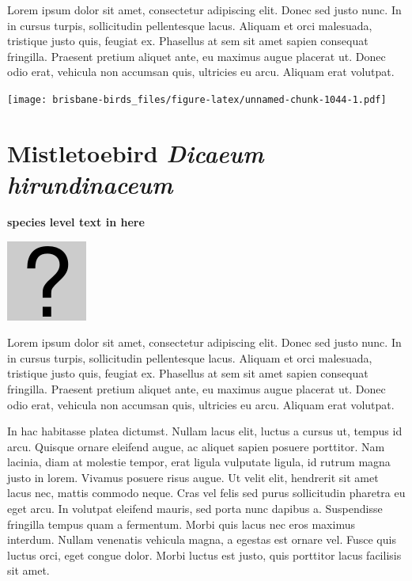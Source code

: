 \documentclass[]{book}
\let\origfigure\figure
\let\endorigfigure\endfigure
\renewenvironment{figure}[1][2] {
  \expandafter\origfigure\expandafter[H]
} {
  \endorigfigure
}
\begin{document}
Lorem ipsum dolor sit amet, consectetur adipiscing elit. Donec sed justo
nunc. In in cursus turpis, sollicitudin pellentesque lacus. Aliquam et
orci malesuada, tristique justo quis, feugiat ex. Phasellus at sem sit
amet sapien consequat fringilla. Praesent pretium aliquet ante, eu
maximus augue placerat ut. Donec odio erat, vehicula non accumsan quis,
ultricies eu arcu. Aliquam erat volutpat.

\texttt{[image: brisbane-birds\_files/figure-latex/unnamed-chunk-1044-1.pdf]}

\section{\texorpdfstring{Mistletoebird \emph{Dicaeum
hirundinaceum}}{Mistletoebird Dicaeum hirundinaceum}}\label{mistletoebird-dicaeum-hirundinaceum}

\textbf{species level text in here}

\begin{figure}
\centering
\includegraphics{assets/missing.png}
\caption{No image for species}
\end{figure}

Lorem ipsum dolor sit amet, consectetur adipiscing elit. Donec sed justo
nunc. In in cursus turpis, sollicitudin pellentesque lacus. Aliquam et
orci malesuada, tristique justo quis, feugiat ex. Phasellus at sem sit
amet sapien consequat fringilla. Praesent pretium aliquet ante, eu
maximus augue placerat ut. Donec odio erat, vehicula non accumsan quis,
ultricies eu arcu. Aliquam erat volutpat.

In hac habitasse platea dictumst. Nullam lacus elit, luctus a cursus ut,
tempus id arcu. Quisque ornare eleifend augue, ac aliquet sapien posuere
porttitor. Nam lacinia, diam at molestie tempor, erat ligula vulputate
ligula, id rutrum magna justo in lorem. Vivamus posuere risus augue. Ut
velit elit, hendrerit sit amet lacus nec, mattis commodo neque. Cras vel
felis sed purus sollicitudin pharetra eu eget arcu. In volutpat eleifend
mauris, sed porta nunc dapibus a. Suspendisse fringilla tempus quam a
fermentum. Morbi quis lacus nec eros maximus interdum. Nullam venenatis
vehicula magna, a egestas est ornare vel. Fusce quis luctus orci, eget
congue dolor. Morbi luctus est justo, quis porttitor lacus facilisis sit
amet.
\end{document}
